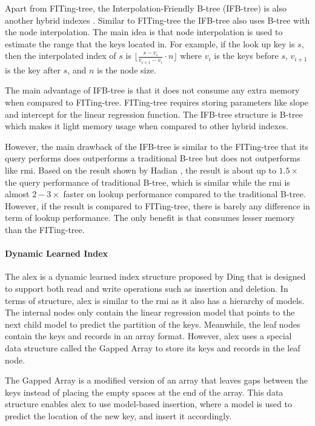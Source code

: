 Apart from FITing-tree, the \textsf{Interpolation-Friendly B-tree} (IFB-tree) is also another hybrid indexes \cite{ifb-tree}. Similar to FITing-tree the IFB-tree also uses B-tree with the node interpolation. The main idea is that node  interpolation is used to estimate the range that the keys located in. For example, if the look up key is $s$, then the interpolated index of $s$ is $\lfloor \frac{s-v_i}{v_{i+1} - v_i} \cdot n \rfloor$ where $v_i$ is the keys before $s$, $v_{i+1}$ is the key after $s$, and $n$ is the node size.

The main advantage of IFB-tree is that it does not consume any extra memory when compared to FITing-tree. FITing-tree requires storing parameters like slope and intercept for the linear regression function. The IFB-tree structure is B-tree which makes it light memory usage when compared to other hybrid indexes. 

However, the main drawback of the IFB-tree is similar to the FITing-tree that its query performs does outperforms a traditional B-tree but does not outperforms \learnindex like \acrshort{rmi}. Based on the result shown by Hadian \cite{ifb-tree}, the result is about up to $1.5\times$ the query performance of traditional B-tree, which is similar while the \acrshort{rmi} is almost $2-3\times$ faster on lookup performance compared to the traditional B-tree. However, if the result is compared to FITing-tree, there is barely any difference in term of lookup performance. The only benefit is that consumes lesser memory than the FITing-tree. 
 
\paragraph{Dynamic Learned Index}
The \acrfull{alex} is a dynamic learned index structure proposed by Ding \cite{ALEX} that is designed to support both read and write operations such as insertion and deletion. In terms of structure, \acrshort{alex} is similar to the \acrshort{rmi} as it also has a hierarchy of models. The internal nodes only contain the linear regression model that points to the next child model to predict the partition of the keys. Meanwhile, the leaf nodes contain the keys and records in an array format. However, \acrshort{alex} uses a special data structure called the \textsf{Gapped Array} to store its keys and records in the leaf node.

The \textsf{Gapped Array} is a modified version of an array that leaves gaps between the keys instead of placing the empty spaces at the end of the array. This data structure enables \acrshort{alex} to use model-based insertion, where a model is used to predict the location of the new key, and insert it accordingly.

